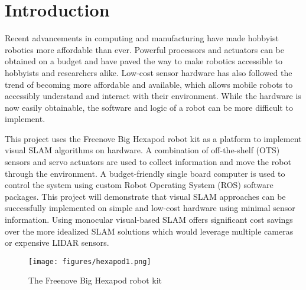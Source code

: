 \section{Introduction}

Recent advancements in computing and manufacturing have made hobbyist robotics more affordable than ever. Powerful processors and actuators can be obtained on a budget and have paved the way to make robotics accessible to hobbyists and researchers alike. Low-cost sensor hardware has also followed the trend of becoming more affordable and available, which allows mobile robots to accessibly understand and interact with their environment. While the hardware is now easily obtainable, the software and logic of a robot can be more difficult to implement.

This project uses the Freenove Big Hexapod robot kit as a platform to implement visual SLAM algorithms on hardware. A combination of off-the-shelf (OTS) sensors and servo actuators are used to collect information and move the robot through the environment. A budget-friendly single board computer is used to control the system using custom Robot Operating System (ROS) \cite{rosnoetic} software packages. This project will demonstrate that visual SLAM approaches can be successfully implemented on simple and low-cost hardware using minimal sensor information. Using monocular visual-based SLAM offers significant cost savings over the more idealized SLAM solutions which would leverage multiple cameras or expensive LIDAR sensors.

\begin{figure}
    \centerline{\texttt{[image: figures/hexapod1.png]}}
    \caption{The Freenove Big Hexapod robot kit}
\end{figure}